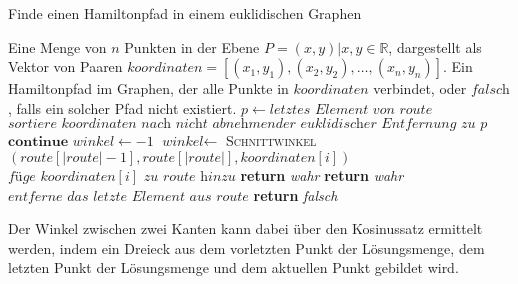 \documentclass[a4paper,10pt,ngerman]{scrartcl}
\begin{document}
    \begin{algorithm}[H]
        \caption{Finde einen Hamiltonpfad in einem euklidischen Graphen}
        \begin{algorithmic}
            \Require Eine Menge von $n$ Punkten in der Ebene $P={(x,y)| x,y \in \mathbb{R}}$, dargestellt als Vektor von Paaren $\textit{koordinaten}=[(x_1,y_1), (x_2,y_2),\dots, (x_n,y_n)]$.
            \Ensure Ein Hamiltonpfad im Graphen, der alle Punkte in $\textit{koordinaten}$ verbindet, oder $\textit{falsch}$, falls ein solcher Pfad nicht existiert.
                    \State $p\gets \textit{letztes Element von } \textit{route}$
                    \State $\textit{sortiere } \textit{koordinaten } \textit{nach nicht abnehmender euklidischer Entfernung zu } p$
                \EndIf
                        \State $\textbf{continue}$
                    \EndIf
                    \State $\textit{winkel}\gets -1$
                        \State $\textit{winkel}\gets$ \textsc{Schnittwinkel}$(\textit{route}[|\textit{route}|-1], \textit{route}[|\textit{route}|], \textit{koordinaten}[i])$
                    \EndIf
                        \State $\textit{füge }\textit{koordinaten}[i]\textit{ zu route hinzu}$
                            \State \textbf{return} \textit{wahr}
                        \EndIf
                            \State \textbf{return} \textit{wahr}
                        \Else
                            \State $\textit{entferne das letzte Element aus route}$
                        \EndIf
                    \EndIf
                \EndFor
                \State \textbf{return} \textit{falsch}
            \EndFunction
        \end{algorithmic}\label{alg:pseudo_greedy}
    \end{algorithm}

    Der Winkel zwischen zwei Kanten kann dabei über den Kosinussatz ermittelt werden,
    indem ein Dreieck aus dem vorletzten Punkt der Lösungsmenge,
    dem letzten Punkt der Lösungsmenge und dem aktuellen Punkt gebildet wird.
\end{document}
